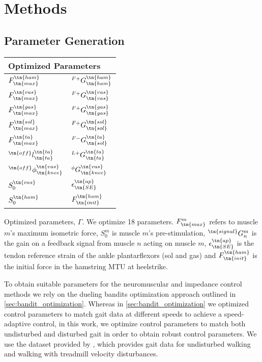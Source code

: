 \section{Methods}

\subsection{Parameter Generation}
\begin{margintable}    
    \centering
    \normalsize
    \begin{tabular}{ll}
        \multicolumn{2}{l}{Optimized Parameters} \\
        \midrule
        $F_\tn{max}^\tn{ham}$              & $^{F+}G_\tn{ham}^\tn{ham}$   \\
        $F_\tn{max}^\tn{vas}$              & $^{F+}G_\tn{vas}^\tn{vas}$   \\
        $F_\tn{max}^\tn{gas}$              & $^{F+}G_\tn{gas}^\tn{gas}$   \\
        $F_\tn{max}^\tn{sol}$              & $^{F+}G_\tn{sol}^\tn{sol}$   \\
        $F_\tn{max}^\tn{ta}$               & $^{F-}G_\tn{sol}^\tn{ta}$    \\
        $^\tn{off}l_\tn{ta}^\tn{ta}$       & $^{L+}G_\tn{ta}^\tn{ta}$     \\
        $^\tn{off}\phi_\tn{knee}^\tn{vas}$ & ${^\phi}G_\tn{knee}^\tn{vas}$ \\
        $S_0^\tn{vas}$                     & $\epsilon_\tn{SE}^\tn{ap}$   \\
        $S_0^\tn{ham}$                     & $F_\tn{init}^\tn{ham}$       \\
    \end{tabular}
    \caption[Parameters optimized for parameter set generation for experiment
    comparing neuromuscular and impedance control]{Optimized parameters,
    $\Gamma$. We optimize 18 parameters. $F_\tn{max}^m$ refers to muscle $m$'s
    maximum isometric force, $S_0^m$ is muscle $m$'s pre-stimulation,
    $^\tn{signal} G_n^m$ is the gain on a feedback signal from muscle $n$
    acting on muscle $m$, $\epsilon_\tn{SE}^\tn{ap}$ is the tendon reference
    strain of the ankle plantarflexors (sol and gas) and $F_\tn{init}^\tn{ham}$
    is the initial force in the hamstring MTU at
    heelstrike.}\label{tab:nm_params_treadmill_exp}
\end{margintable}
To obtain suitable parameters for the neuromuscular and impedance control
methods we rely on the dueling bandits optimization approach outlined in
\cref{sec:bandit_optimization}. Whereas in \cref{sec:bandit_optimization} we
optimized control parameters to match gait data at different speeds to achieve a
speed-adaptive control, in this work, we optimize control parameters to match
both undisturbed and disturbed gait in order to obtain robust control
parameters. We use the dataset provided by \citet{moore2015elaborate}, which
provides gait data for undisturbed walking and walking with treadmill velocity
disturbances. 

